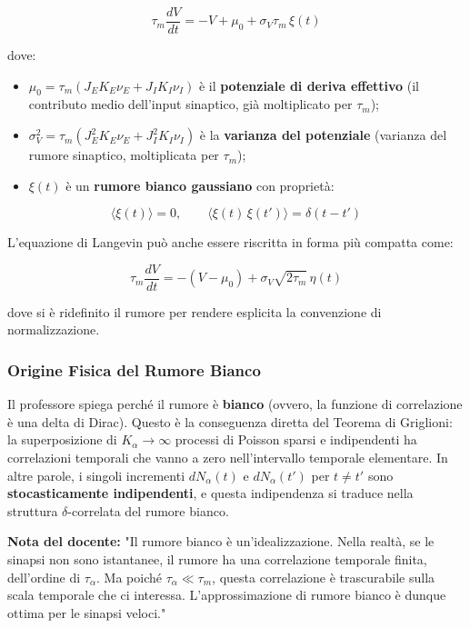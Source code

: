 \begin{equation}
\tau_m \frac{dV}{dt} = -V + \mu_0 + \sigma_V \tau_m\, \xi(t)
\end{equation}

dove:
\begin{itemize}
    \item $\mu_0 = \tau_m(J_E K_E \nu_E + J_I K_I \nu_I)$ è il \textbf{potenziale di deriva effettivo} (il contributo medio dell'input sinaptico, già moltiplicato per $\tau_m$);
    \item $\sigma_V^2 = \tau_m (J_E^2 K_E \nu_E + J_I^2 K_I \nu_I)$ è la \textbf{varianza del potenziale} (varianza del rumore sinaptico, moltiplicata per $\tau_m$);
    \item $\xi(t)$ è un \textbf{rumore bianco gaussiano} con proprietà:
\end{itemize}

\begin{equation}
\langle \xi(t) \rangle = 0, \qquad \langle \xi(t)\, \xi(t') \rangle = \delta(t - t')
\end{equation}

L'equazione di Langevin può anche essere riscritta in forma più compatta come:

\begin{equation}
\tau_m \frac{dV}{dt} = -(V - \mu_0) + \sigma_V \sqrt{2\tau_m}\, \eta(t)
\end{equation}

dove si è ridefinito il rumore per rendere esplicita la convenzione di normalizzazione.

\subsubsection{Origine Fisica del Rumore Bianco}

Il professore spiega perché il rumore è \textbf{bianco} (ovvero, la funzione di correlazione è una delta di Dirac). Questo è la conseguenza diretta del Teorema di Griglioni: la superposizione di $K_\alpha \to \infty$ processi di Poisson sparsi e indipendenti ha correlazioni temporali che vanno a zero nell'intervallo temporale elementare. In altre parole, i singoli incrementi $dN_\alpha(t)$ e $dN_\alpha(t')$ per $t \neq t'$ sono \textbf{stocasticamente indipendenti}, e questa indipendenza si traduce nella struttura $\delta$-correlata del rumore bianco.

\begin{tcolorbox}[colback=gray!5, colframe=gray!40, arc=2mm, boxrule=0.5pt]
\textbf{Nota del docente:} "Il rumore bianco è un'idealizzazione. Nella realtà, se le sinapsi non sono istantanee, il rumore ha una correlazione temporale finita, dell'ordine di $\tau_\alpha$. Ma poiché $\tau_\alpha \ll \tau_m$, questa correlazione è trascurabile sulla scala temporale che ci interessa. L'approssimazione di rumore bianco è dunque ottima per le sinapsi veloci."
\end{tcolorbox}



